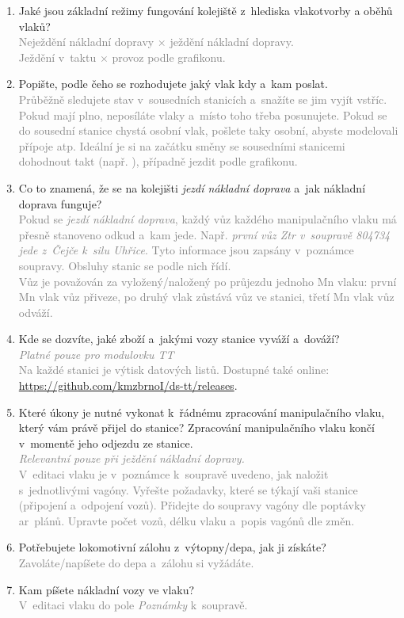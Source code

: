\documentclass[12pt,a4paper]{article}
\newcommand{\solution}[1]{\\ \textcolor{gray}{#1}}
\newcommand{\solution}[1]{}
\begin{document}
\begin{enumerate}[leftmargin=*]
\item Jaké jsou základní režimy fungování kolejiště z~hlediska vlakotvorby
a oběhů vlaků?
\solution{Neježdění nákladní dopravy × ježdění nákladní dopravy. \\
Ježdění v~taktu × provoz podle grafikonu.}

\item Popište, podle čeho se rozhodujete jaký vlak kdy a~kam poslat.
\solution{Průběžně sledujete stav v~sousedních stanicích a~snažíte se jim vyjít
vstříc. Pokud mají plno, neposíláte vlaky a~místo toho třeba posunujete. Pokud
se do sousední stanice chystá osobní vlak, pošlete taky osobní, abyste
modelovali přípoje atp. Ideální je si na začátku směny se sousedními stanicemi
dohodnout takt (např. \uv{jeden vlak za jeden vlak}), případně jezdit podle
grafikonu.}

\item Co to znamená, že se na kolejišti \textit{jezdí nákladní doprava} a~jak
nákladní doprava funguje?
\solution{Pokud se \textit{jezdí nákladní doprava}, každý vůz každého
manipulačního vlaku má přesně stanoveno odkud a~kam jede. Např. \textit{první
vůz Ztr v~soupravě 804734 jede z~Čejče k~silu Uhřice}. Tyto informace jsou
zapsány v~poznámce soupravy. Obsluhy stanic se podle nich řídí. \\ Vůz je
považován za vyložený/naložený po průjezdu jednoho Mn vlaku: první Mn vlak vůz
přiveze, po druhý vlak zůstává vůz ve stanici, třetí Mn vlak vůz odváží.}

\item Kde se dozvíte, jaké zboží a~jakými vozy stanice vyváží a~dováží?
\solution{\textit{Platné pouze pro modulovku TT} \\ Na každé stanici je výtisk
datových listů. Dostupné také online:\\
\url{https://github.com/kmzbrnoI/ds-tt/releases}}.

\item Které úkony je nutné vykonat k~řádnému zpracování manipulačního vlaku,
který vám právě přijel do stanice? Zpracování manipulačního vlaku končí
v~momentě jeho odjezdu ze stanice.
\solution{\textit{Relevantní pouze při ježdění nákladní dopravy.} \\ V~editaci
vlaku je v~poznámce k~soupravě uvedeno, jak naložit s~jednotlivými vagóny.
Vyřešte požadavky, které se týkají vaši stanice (připojení a~odpojení vozů).
Přidejte do soupravy vagóny dle poptávky ar~plánů. Upravte počet vozů, délku
vlaku a~popis vagónů dle změn.}

\item Potřebujete lokomotivní zálohu z~výtopny/depa, jak ji získáte?
\solution{Zavoláte/napíšete do depa a~zálohu si vyžádáte.}

\item Kam píšete nákladní vozy ve vlaku?
\solution{V~editaci vlaku do pole \textit{Poznámky} k~soupravě.}

\end{enumerate}
\end{document}
